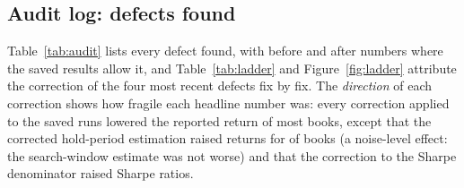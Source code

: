 \documentclass[11pt]{article}
\theoremstyle{definition}
\newcommand{\1}{\mathbf{1}}
\begin{document}
\subsection{Audit log: defects found}\label{sec:auditlog}

Table~\ref{tab:audit} lists every defect found, with before and after numbers where the saved results allow it, and Table~\ref{tab:ladder} and Figure~\ref{fig:ladder} attribute the correction of the four most recent defects fix by fix. The \emph{direction} of each correction shows how
fragile each headline number was: every correction applied to the saved runs lowered the reported return of most books, except that the corrected hold-period estimation raised returns for  of  books (a noise-level effect: the search-window estimate was not worse) and that the
correction to the Sharpe denominator raised Sharpe ratios.
\end{document}
